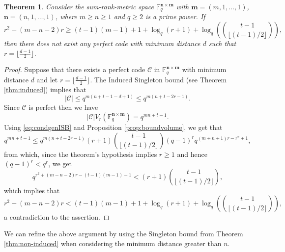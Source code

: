 \documentclass[a4paper]{article}
\newtheorem{theorem}[formula]{Theorem}
\newcommand{\F}{\mathbb{F}}
\newcommand{\Fq}{\F_q}
\newcommand{\bfn}{\mathbf {n}}
\newcommand{\bfm}{\mathbf {m}}
\newcommand{\spac}{\F^{\bfn\times\bfm}_q}
\begin{document}
\begin{theorem}
    Consider the sum-rank-metric space $\spac$ with $\bfm=(m,1,\dots,1)$, $\bfn=(n,1,\dots,1)$, where $m\geq n\geq1$ and $q\geq 2$ is a prime power.
    If
    \[r^2+(m-n-2)r \geq  (t-1)(m-1)+1+ \log_q(r+1)+\log_q\left( {t-1 \choose \lfloor (t-1)/2\rfloor}\right),\]
    then there does not exist any perfect code with minimum distance $d$ such that $r=\lfloor \frac{d-1}2\rfloor$.
\end{theorem}
\begin{proof}
    Suppose that there exists a perfect code $\mathcal{C}$ in $\spac$ with minimum distance $d$ and let $r=\lfloor \frac{d-1}2\rfloor$.
    The Induced Singleton bound (see Theorem \ref{thm:induced}) implies that 
    \begin{equation}\label{eq:condgenISB}
    |\mathcal{C}|\leq q^{m(n+t-1-d+1)}\leq q^{m(n+t-2r-1)}. 
    \end{equation}
    Since $\mathcal{C}$ is perfect then we have
    \[ |\mathcal{C}|V_r(\Fq^{\bfn\times\bfm})=q^{mn+t-1}.  \]
    Using \eqref{eq:condgenISB} and Proposition \ref{prop:boundvolume}, we get that 
    \[q^{mn+t-1} \leq q^{m(n+t-2r-1)} (r+1) {t-1 \choose \lfloor (t-1)/2\rfloor} (q-1)^r q^{(m+n+1)r-r^2+1},  \]
    from which, since the theorem's hypothesis implies $r\geq 1$ and hence $(q-1)^r<q^r$, we get
    \[q^{r^2+(m-n-2)r-(t-1)(m-1)-1}< (r+1) {t-1 \choose \lfloor (t-1)/2\rfloor}, \]
    which implies that 
    \[r^2+(m-n-2)r < (t-1)(m-1)+1+ \log_q(r+1)+\log_q\left( {t-1 \choose \lfloor (t-1)/2\rfloor}\right),\]
    a contradiction to the assertion.
\end{proof}

We can refine the above argument by using the Singleton bound from Theorem \ref{thm:non-induced} when considering the minimum distance greater than $n$.
 

\end{document}
